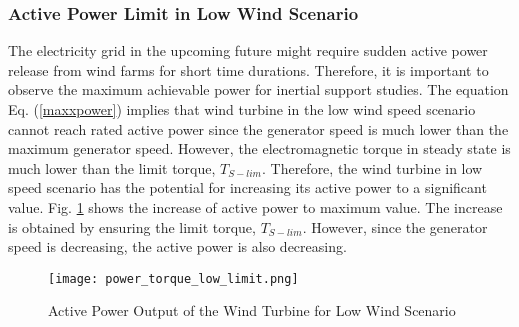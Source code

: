 \subsubsection{Active Power Limit in Low Wind Scenario}
The electricity grid in the upcoming future might require sudden active power release from wind farms for short time durations. Therefore, it is important to observe the maximum achievable power for inertial support studies. The equation Eq. (\ref{maxxpower}) implies that wind turbine in the low wind speed scenario cannot reach rated active power since the generator speed is much lower than the maximum generator speed. However, the electromagnetic torque in steady state is much lower than the limit torque, $T_{S-lim}$. Therefore, the wind turbine in low speed scenario has the potential for increasing its active power to a significant value. Fig. \ref{low_limit_power} shows the increase of active power to maximum value. The increase is obtained by ensuring the limit torque, $T_{S-lim}$. However, since the generator speed is decreasing, the active power is also decreasing. 

\begin{figure}[h!]
	\centering
	\texttt{[image: power\_torque\_low\_limit.png]}
	\caption{Active Power Output of the Wind Turbine for Low Wind Scenario}
	\label{low_limit_power}
\end{figure}
